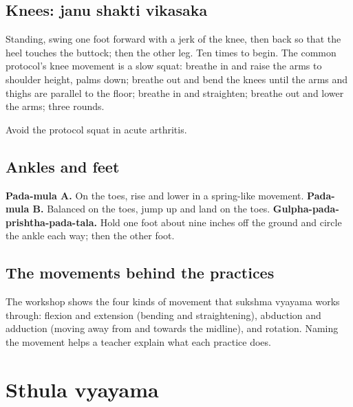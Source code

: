 \subsection*{Knees: janu shakti vikasaka}
Standing, swing one foot forward with a jerk of the knee, then back so that the heel touches the buttock; then the other leg. Ten times to begin. The common protocol's knee movement is a slow squat: breathe in and raise the arms to shoulder height, palms down; breathe out and bend the knees until the arms and thighs are parallel to the floor; breathe in and straighten; breathe out and lower the arms; three rounds.

\begin{caution}
Avoid the protocol squat in acute arthritis.
\end{caution}


\subsection*{Ankles and feet}
\textbf{Pada-mula A.} On the toes, rise and lower in a spring-like movement. \textbf{Pada-mula B.} Balanced on the toes, jump up and land on the toes.
\textbf{Gulpha-pada-prishtha-pada-tala.} Hold one foot about nine inches off the ground and circle the ankle each way; then the other foot.


\subsection*{The movements behind the practices}
The workshop shows the four kinds of movement that sukshma vyayama works through: flexion and extension (bending and straightening), abduction and adduction (moving away from and towards the midline), and rotation. Naming the movement helps a teacher explain what each practice does.


\section{Sthula vyayama}

